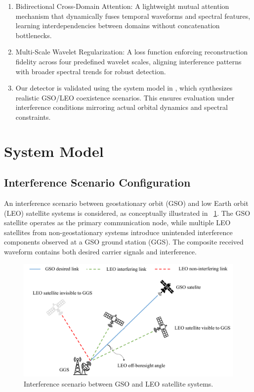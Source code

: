 \documentclass[10pt, conference]{IEEEtran}
\begin{document}
\begin{enumerate}
    \item Bidirectional Cross-Domain Attention: A lightweight mutual attention mechanism that dynamically fuses temporal waveforms and spectral features, learning interdependencies between domains without concatenation bottlenecks.
    \item Multi-Scale Wavelet Regularization: A loss function enforcing reconstruction fidelity across four predefined wavelet scales, aligning interference patterns with broader spectral trends for robust detection.
    \item Our detector is validated using the system model in \cite{saifaldawlaGenAIBasedModelsNGSO2024}, which synthesizes realistic GSO/LEO coexistence scenarios. This ensures evaluation under interference conditions mirroring actual orbital dynamics and spectral constraints.
\end{enumerate}

\section{System Model}
\label{sec:system_model}

\subsection{Interference Scenario Configuration}
An interference scenario between geostationary orbit (GSO) and low Earth orbit (LEO) satellite systems is considered, as conceptually illustrated in \figurename~\ref{fig:interference-scenario}. The GSO satellite operates as the primary communication node, while multiple LEO satellites from non-geostationary systems introduce unintended interference components observed at a GSO ground station (GGS). The composite received waveform contains both desired carrier signals and interference.

\begin{figure}[tb]
    \centering
    \includegraphics[width=\linewidth]{system-model.pdf}
    \caption{Interference scenario between GSO and LEO satellite systems.}
    \label{fig:interference-scenario}
\end{figure}
\end{document}

